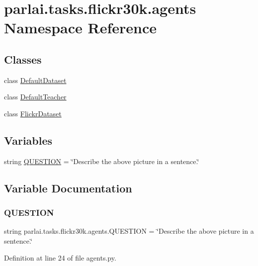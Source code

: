 \hypertarget{namespaceparlai_1_1tasks_1_1flickr30k_1_1agents}{}\section{parlai.\+tasks.\+flickr30k.\+agents Namespace Reference}
\label{namespaceparlai_1_1tasks_1_1flickr30k_1_1agents}
\subsection*{Classes}
\begin{DoxyCompactItemize}
\item 
class \hyperlink{classparlai_1_1tasks_1_1flickr30k_1_1agents_1_1DefaultDataset}{Default\+Dataset}
\item 
class \hyperlink{classparlai_1_1tasks_1_1flickr30k_1_1agents_1_1DefaultTeacher}{Default\+Teacher}
\item 
class \hyperlink{classparlai_1_1tasks_1_1flickr30k_1_1agents_1_1FlickrDataset}{Flickr\+Dataset}
\end{DoxyCompactItemize}
\subsection*{Variables}
\begin{DoxyCompactItemize}
\item 
string \hyperlink{namespaceparlai_1_1tasks_1_1flickr30k_1_1agents_af6a2b361765bec718f55428cd47fa64a}{Q\+U\+E\+S\+T\+I\+ON} = \char`\"{}Describe the above picture in a sentence.\char`\"{}
\end{DoxyCompactItemize}


\subsection{Variable Documentation}
\mbox{\label{namespaceparlai_1_1tasks_1_1flickr30k_1_1agents_af6a2b361765bec718f55428cd47fa64a}} 
\subsubsection{\texorpdfstring{Q\+U\+E\+S\+T\+I\+ON}{QUESTION}}
{\footnotesize\ttfamily string parlai.\+tasks.\+flickr30k.\+agents.\+Q\+U\+E\+S\+T\+I\+ON = \char`\"{}Describe the above picture in a sentence.\char`\"{}}



Definition at line 24 of file agents.\+py.

